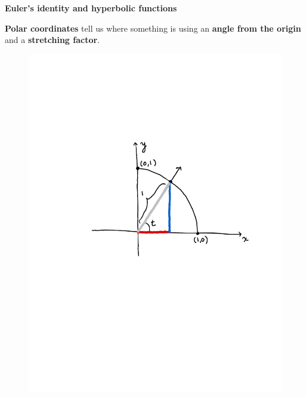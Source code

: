 \documentclass[11pt,serif,aspectratio=169]{beamer}
\begin{document}
	\begin{frame}[c]\centering \Large \bf
		Euler's identity and hyperbolic functions	
	\end{frame}
	
	\begin{frame}[c]
		\textbf{Polar coordinates} tell us where something is using an \textbf{angle from the origin} and a \textbf{stretching factor}.
	\end{frame}
	
	\begin{frame}[c]
		\begin{figure}
			\centering
			\includegraphics[height=0.9\paperheight]{polar.pdf}	
		\end{figure}
	\end{frame}
	
\end{document}
